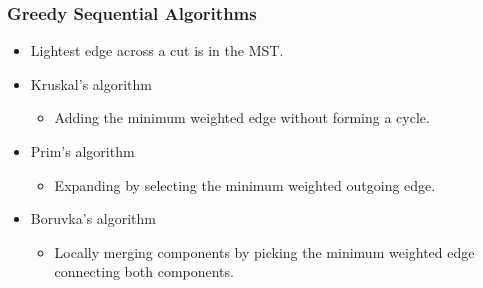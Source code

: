 \begin{frame}
\frametitle{Greedy Sequential Algorithms}

\begin{itemize}
\item Lightest edge across a cut is in the MST.
\end{itemize}
\begin{itemize}
  \item Kruskal's algorithm
    \begin{itemize} 
      \item Adding the minimum weighted edge without forming a cycle.
    \end{itemize}
  \item Prim's algorithm
    \begin{itemize} 
      \item Expanding by selecting the minimum weighted outgoing edge.
    \end{itemize}
  \item Boruvka's algorithm
    \begin{itemize}
      \item Locally merging components by picking the minimum weighted edge connecting both components.
    \end{itemize}
\end{itemize}
\end{frame}

